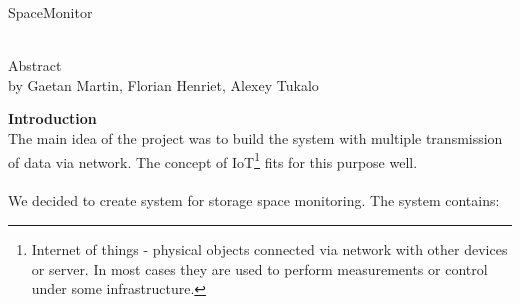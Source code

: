 \documentclass[english]{article}
\date{}
\begin{document}
\begin{center}
\begin{large}
SpaceMonitor
\end{large}\\
Abstract\\
by 
Gaetan Martin,
Florian Henriet,
Alexey Tukalo
\end{center}

\textbf{Introduction }\\
The main idea of the project was to build the system with multiple transmission of data via network. The concept of IoT\footnote{Internet of things - physical objects connected via network with other devices or server. In most cases they are used to perform measurements or control under some infrastructure.} fits for this purpose well.\\\\
We decided to create system for storage space monitoring. The system contains: 
\end{document}
